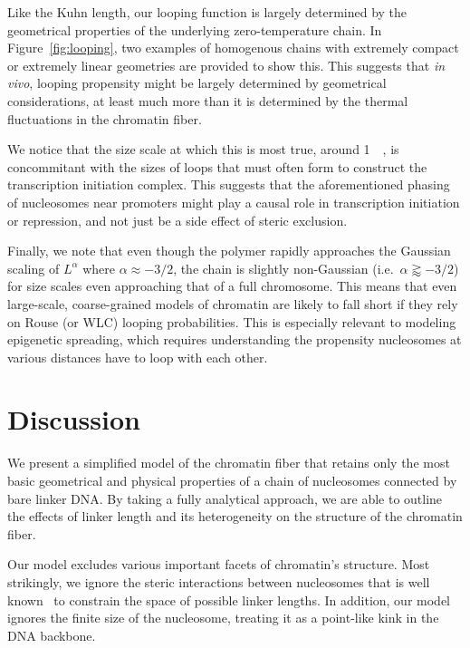\documentclass[%
 reprint,
superscriptaddress,
showpacs,preprintnumbers,
 amsmath,amssymb,
 aps,
 prl,
]{revtex4-1}
\begin{document}
Like the Kuhn length, our looping function is largely determined by the
    geometrical properties of the underlying zero-temperature chain.
In Figure~\ref{fig:looping}, two examples of homogenous chains with extremely
    compact or extremely linear geometries are provided to show this.
This suggests that \textit{in vivo}, looping propensity might be largely
    determined by geometrical considerations, at least much more than it is
    determined by the thermal fluctuations in the chromatin fiber.

We notice that the size scale at which this is most true, around
    \SI{1}{\kilo\basepair}, is concommitant with the sizes of loops that must
    often form to construct the transcription initiation complex.
This suggests that the aforementioned phasing of nucleosomes near promoters
    might play a causal role in transcription initiation or repression, and not
    just be a side effect of steric exclusion.

Finally, we note that even though the polymer rapidly approaches the Gaussian
    scaling of $L^\alpha$ where $\alpha \approx -3/2$, the chain is slightly
    non-Gaussian (i.e.\ $\alpha \gtrapprox -3/2$) for size scales even
    approaching that of a full chromosome.
This means that even large-scale, coarse-grained models of chromatin are likely
    to fall short if they rely on Rouse (or WLC) looping probabilities.
This is especially relevant to modeling epigenetic spreading, which requires
    understanding the propensity nucleosomes at various distances have to loop with
    each other.

\section{Discussion}

We present a simplified model of the chromatin fiber that retains only the most
    basic geometrical and physical properties of a chain of nucleosomes
    connected by bare linker DNA.\@
By taking a fully analytical approach, we are able to outline the effects of
    linker length and its heterogeneity on the structure of the chromatin fiber.

Our model excludes various important facets of chromatin's structure.
Most strikingly, we ignore the steric interactions between nucleosomes that is
    well known~\cite{widom1992} to constrain the space of possible linker
    lengths.
In addition, our model ignores the finite size of the nucleosome, treating it as
    a point-like kink in the DNA backbone.
\end{document}
